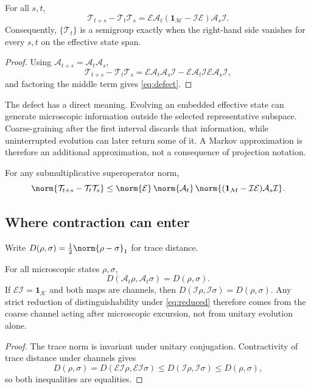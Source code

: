 \documentclass[11pt]{article}
\newcommand{\Micro}{\mathcal M}
\newcommand{\Eff}{\mathcal K}
\newcommand{\EE}{\mathcal E}
\newcommand{\II}{\mathcal I}
\newcommand{\Dyn}{\mathcal A}
\newcommand{\TT}{\mathcal T}
\newcommand{\id}{\mathbf 1}
\begin{document}
\begin{theorem}\label{thm:defect}
For all $s,t$,
\begin{equation}\label{eq:defect}
 \TT_{t+s}-\TT_t\TT_s
 =
 \EE\Dyn_t(\id_{\Micro}-\II\EE)\Dyn_s\II .
\end{equation}
Consequently, $\{\TT_t\}$ is a semigroup exactly when the right-hand side
vanishes for every $s,t$ on the effective state span.
\end{theorem}

\begin{proof}
Using $\Dyn_{t+s}=\Dyn_t\Dyn_s$,
\[
\TT_{t+s}-\TT_t\TT_s
=
\EE\Dyn_t\Dyn_s\II-\EE\Dyn_t\II\EE\Dyn_s\II,
\]
and factoring the middle term gives \cref{eq:defect}.
\end{proof}

The defect has a direct meaning.  Evolving an embedded effective state
can generate microscopic information outside the selected representative
subspace.  Coarse-graining after the first interval discards that
information, while uninterrupted evolution can later return some of it.
A Markov approximation is therefore an additional approximation, not a
consequence of projection notation.

\begin{corollary}\label{cor:defect}
For any submultiplicative superoperator norm,
\[
 \norm{\TT_{t+s}-\TT_t\TT_s}
 \leq
 \norm{\EE}\,\norm{\Dyn_t}\,
 \norm{(\id_{\Micro}-\II\EE)\Dyn_s\II}.
\]
\end{corollary}

\subsection{Where contraction can enter}

Write $D(\rho,\sigma)=\frac12\norm{\rho-\sigma}_1$ for trace distance.

\begin{proposition}\label{prop:isometry}
For all microscopic states $\rho,\sigma$,
\[
 D(\Dyn_t\rho,\Dyn_t\sigma)=D(\rho,\sigma).
\]
If $\EE\II=\id_{\Eff}$ and both maps are channels, then
$D(\II\rho,\II\sigma)=D(\rho,\sigma)$.  Any strict reduction of
distinguishability under \cref{eq:reduced} therefore comes from the
coarse channel acting after microscopic excursion, not from unitary
evolution alone.
\end{proposition}

\begin{proof}
The trace norm is invariant under unitary conjugation.  Contractivity of
trace distance under channels gives
\[
D(\rho,\sigma)=D(\EE\II\rho,\EE\II\sigma)
\leq D(\II\rho,\II\sigma)\leq D(\rho,\sigma),
\]
so both inequalities are equalities.
\end{proof}
\end{document}
